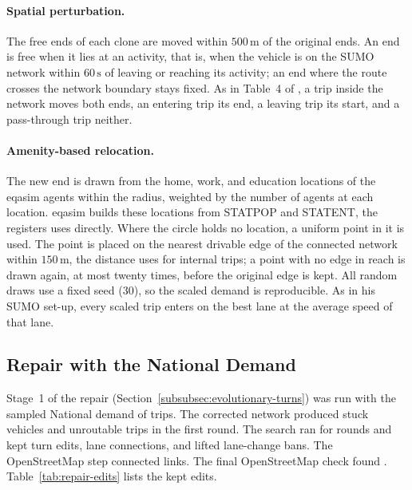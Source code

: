 \paragraph{Spatial perturbation.} The free ends of each clone are moved
within \(500\,\mathrm{m}\) of the original ends. An end is free when it
lies at an activity, that is, when the vehicle is on the SUMO network
within \(60\,\mathrm{s}\) of leaving or reaching its activity; an end
where the route crosses the network boundary stays fixed. As in
Table~4 of \citet{baggenstos2026}, a trip inside the network moves both
ends, an entering trip its end, a leaving trip its start, and a
pass-through trip neither.

\paragraph{Amenity-based relocation.} The new end is drawn from the
home, work, and education locations of the eqasim agents within the
radius, weighted by the number of agents at each location. eqasim
builds these locations from STATPOP and STATENT, the registers
\citet{baggenstos2026} uses directly. Where the circle holds no
location, a uniform point in it is used. The point is placed on the
nearest drivable edge of the connected network within
\(150\,\mathrm{m}\), the distance \citet{baggenstos2026} uses for
internal trips; a point with no edge in reach is drawn again, at most
twenty times, before the original edge is kept. All random draws use a
fixed seed (30), so the scaled demand is reproducible. As in his SUMO
set-up, every scaled trip enters on the best lane at the average speed
of that lane.

\subsection{Repair with the National Demand}
\label{sec:national-repair}

Stage~1 of the repair (Section~\ref{subsubsec:evolutionary-turns}) was
run with the sampled National demand of  trips. The
corrected network produced  stuck vehicles and 
unroutable trips in the first round. The search ran for 
rounds and kept  turn edits,  lane connections, and
lifted  lane-change bans. The OpenStreetMap step connected
 links. The final OpenStreetMap check found
.
Table~\ref{tab:repair-edits} lists the kept edits.

